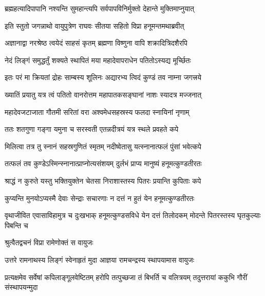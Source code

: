 \twolineshloka
{ब्रह्महत्यादिपापानि नश्यन्ति सुमहान्त्यपि}
{सर्वपापविनिर्मुक्तो देहान्ते मुक्तिमाप्नुयात्}%

\twolineshloka
{इति स्तुतो जगन्नाथो वायुपुत्रेण राघवः}
{सीतया सहितो विप्रा हनूमन्तमथाब्रवीत्}%


\twolineshloka
{अज्ञानाद्वा नरश्रेष्ठ त्वयेदं साहसं कृतम्}
{ब्रह्मणा विष्णुना वापि शक्रादित्रिदशैरपि}%

\twolineshloka
{नेदं लिङ्गं समुद्धर्तुं शक्यते स्थापितं मया}
{महादेवापराधेन पतितोऽस्यद्य मूर्च्छितः}%

\twolineshloka
{इतः परं मा क्रियतां द्रोहः साम्बस्य शूलिनः}
{अद्यारभ्य त्विदं कुण्डं तव नाम्ना जगत्त्रये}%

\twolineshloka
{ख्यातिं प्रयातु यत्र त्वं पतितो वानरोत्तम}
{महापातकसङ्घानां नाशः स्यादत्र मज्जनात्}%

\twolineshloka
{महादेवजटाजाता गौतमी सरितां वरा}
{अश्वमेधसहस्रस्य फलदा स्नायिनां नृणाम्}%

\twolineshloka
{ततः शतगुणा गङ्गा यमुना च सरस्वती}
{एतन्नदीत्रयं यत्र स्थले प्रवहते कपे}%

\twolineshloka
{मिलित्वा तत्र तु स्नानं सहस्रगुणितं स्मृतम्}
{नदीष्वेतासु यत्स्नानात्फलं पुंसां भवेत्कपे}%

\twolineshloka
{तत्फलं तव कुण्डेऽस्मिन्स्नानात्प्राप्नोत्यसंशयम्}
{दुर्लभं प्राप्य मानुष्यं हनूमत्कुण्डतीरतः}%

\twolineshloka
{श्राद्धं न कुरुते यस्तु भक्तियुक्तेन चेतसा}
{निराशास्तस्य पितरः प्रयान्ति कुपिताः कपे}%

\twolineshloka
{कुप्यन्ति मुनयोऽप्यस्मै देवाः सेन्द्राः सचारणाः}
{न दत्तं न हुतं येन हनूमत्कुण्डतीरतः}%

\threelineshloka
{वृथाजीवित एवासाविहामुत्र च दुःखभाक्}
{हनूमत्कुण्डसविधे येन दत्तं तिलोदकम्}
{मोदन्ते पितरस्तस्य घृतकुल्याः पिबन्ति च}%



\onelineshloka
{श्रुत्वैतद्वचनं विप्रा रामेणोक्तं स वायुजः}%

\twolineshloka
{उत्तरे रामनाथस्य लिङ्गं स्वेनाहृतं मुदा}
{आज्ञया रामचन्द्रस्य स्थापयामास वायुजः}%

\threelineshloka
{प्रत्यक्षमेव सर्वेषां कपिलाङ्गूलवेष्टितम्}
{हरोपि तत्पुच्छजा तं बिभर्ति च वलित्रयम्}
{तदुत्तरायां ककुभि गौरीं संस्थापयन्मुदा}%


